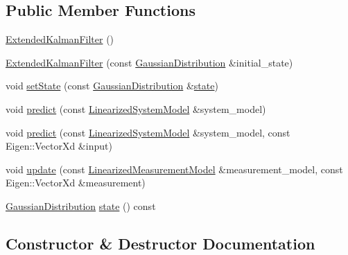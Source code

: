 \subsection*{Public Member Functions}
\begin{DoxyCompactItemize}
\item 
\hyperlink{classrefill_1_1ExtendedKalmanFilter_abf91ae94c74b1c2b8867e047d0859157}{Extended\+Kalman\+Filter} ()
\item 
\hyperlink{classrefill_1_1ExtendedKalmanFilter_af6ca041395079f69d8d32ea7376bdac5}{Extended\+Kalman\+Filter} (const \hyperlink{classrefill_1_1GaussianDistribution}{Gaussian\+Distribution} \&initial\+\_\+state)
\item 
void \hyperlink{classrefill_1_1ExtendedKalmanFilter_a10ebb05351e9e18a460e1fce35ba479a}{set\+State} (const \hyperlink{classrefill_1_1GaussianDistribution}{Gaussian\+Distribution} \&\hyperlink{classrefill_1_1ExtendedKalmanFilter_a7a8f223486039d0232e6c9d0d10b25d3}{state})
\item 
void \hyperlink{classrefill_1_1ExtendedKalmanFilter_a186407ebdf927d7a498a3e9a78a15ffc}{predict} (const \hyperlink{classrefill_1_1LinearizedSystemModel}{Linearized\+System\+Model} \&system\+\_\+model)
\item 
void \hyperlink{classrefill_1_1ExtendedKalmanFilter_ae1f0a6cd50a58b8b9c482985b2c04bd7}{predict} (const \hyperlink{classrefill_1_1LinearizedSystemModel}{Linearized\+System\+Model} \&system\+\_\+model, const Eigen\+::\+Vector\+Xd \&input)
\item 
void \hyperlink{classrefill_1_1ExtendedKalmanFilter_a7d498bfa574e87ef06c30df91d74b8ea}{update} (const \hyperlink{classrefill_1_1LinearizedMeasurementModel}{Linearized\+Measurement\+Model} \&measurement\+\_\+model, const Eigen\+::\+Vector\+Xd \&measurement)
\item 
\hyperlink{classrefill_1_1GaussianDistribution}{Gaussian\+Distribution} \hyperlink{classrefill_1_1ExtendedKalmanFilter_a7a8f223486039d0232e6c9d0d10b25d3}{state} () const 
\end{DoxyCompactItemize}


\subsection{Constructor \& Destructor Documentation}
